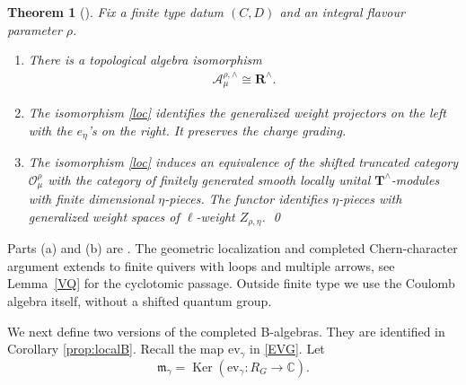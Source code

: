 \documentclass[11pt,reqno]{amsart}
\newtheorem{Theorem}{Theorem}[section]
\theoremstyle{definition}
\theoremstyle{remark}
\def\bbC{\mathbb C}
\def\scrO{\mathscr O}
\def\calA{\mathcal A}
\def\Ker{\operatorname{Ker}}
\def\ev{\mathrm{ev}}
\def\bR{\mathbf R}
\def\bT{\mathbf T}
\begin{document}
\begin{Theorem}[\cite{VV25}]\label{thm:V}\label{V}
Fix a finite type datum $(C,D)$ and an integral flavour
parameter $\rho$.
\hfill
\begin{enumerate}[label=$\mathrm{(\alph*)}$,leftmargin=8mm]
\item
There is a topological algebra isomorphism
\begin{align}\label{loc}\calA_{\mu}^{\rho,\wedge}\cong\bR^\wedge.\end{align}
\item
The isomorphism \eqref{loc} identifies the generalized weight projectors on the left with the 
$e_\eta$'s on the right. It preserves the charge
grading.
\item
The isomorphism \eqref{loc} induces an equivalence of the shifted truncated category $\scrO_\mu^\rho$
with the
category of finitely generated smooth locally unital
$\bT^\wedge$-modules with finite dimensional $\eta$-pieces.
The functor identifies $\eta$-pieces with 
generalized weight spaces of $\ell$-weight $Z_{\rho,\eta}$.
\qed
\end{enumerate}
\end{Theorem}

Parts (a) and (b) are \cite[Thm.~4.3.1, Lem.~4.3.5]{VV25}.
The geometric localization and completed Chern-character argument
extends to finite quivers with loops and multiple arrows, see
Lemma~\ref{VQ} for the cyclotomic passage. Outside finite type we
use the Coulomb algebra itself, without a shifted quantum group.

We next define two versions of the completed  B-algebras.
They are identified in Corollary \ref{prop:localB}. 
Recall the map $\ev_\gamma$ in \eqref{EVG}.
Let 
$$\mathfrak m_\gamma=\Ker(\ev_\gamma:R_G\to\bbC).$$
\end{document}
